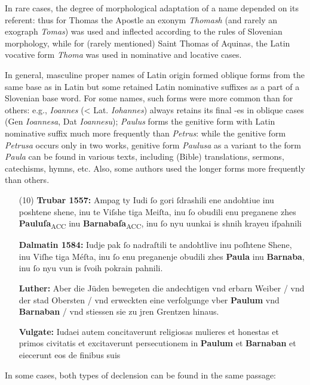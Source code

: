 \documentclass[output=paper,colorlinks,citecolor=brown,arabicfont,chinesefont]{langscibook}
\begin{document}
In rare cases, the degree of morphological adaptation of a name depended on its referent: thus for Thomas the Apostle an exonym \emph{Thomash} (and rarely an exograph \emph{Tomas}) was used and inflected according to the rules of Slovenian morphology, while for (rarely mentioned) Saint Thomas of Aquinas, the Latin vocative form \emph{Thoma} was used in nominative and locative cases.

In general, masculine proper names of Latin origin formed oblique forms from the same base as in Latin but some retained Latin nominative suffixes as a part of a Slovenian base word.  For some names, such forms were more common than for others: e.g., \emph{Ioannes} (< Lat. \emph{Iohannes}) always retains its final -es in oblique cases (Gen \emph{Ioannesa}, Dat \emph{Ioannesu}); \emph{Paulus} forms the genitive form with Latin nominative suffix much more frequently than \emph{Petrus}: while the genitive form \emph{Petrusa} occurs only in two works, genitive form \emph{Paulusa} as a variant to the form \emph{Paula} can be found in various texts, including (Bible) translations, sermons, catechisms, hymns, etc. Also, some authors used the longer forms more frequently than others. 

\begin{itemize}
    \item[(10)] \textbf{Trubar 1557:} Ampag ty Iudi ſo gori ſdrashili ene andohtiue inu poshtene shene, inu te Viſshe tiga Meiſta, inu ſo obudili enu preganene zhes \textbf{Pauluſa}\textsubscript{ACC} inu \textbf{Barnabaſa}\textsubscript{ACC}, inu ſo nyu uunkai is shnih krayeu iſpahnili
    
    \textbf{Dalmatin 1584:} Iudje pak ſo nadraſtili te andohtlive inu poſhtene Shene, inu Viſhe tiga Méſta, inu ſo enu preganenje obudili zhes \textbf{Paula} inu \textbf{Barnaba}, inu ſo nyu vun is ſvoih pokrain pahnili.
    
    \textbf{Luther:} Aber die Jüden bewegeten die andechtigen vnd erbarn Weiber / vnd der stad Obersten / vnd erweckten eine verfolgunge vber \textbf{Paulum} vnd \textbf{Barnaban} / vnd stiessen sie zu jren Grentzen hinaus.
    
    \textbf{Vulgate:} Iudaei autem concitaverunt religiosas mulieres et honestas et primos civitatis et excitaverunt persecutionem in \textbf{Paulum} et \textbf{Barnaban} et eiecerunt eos de finibus suis

\end{itemize}

In some cases, both types of declension can be found in the same passage:
\end{document}
